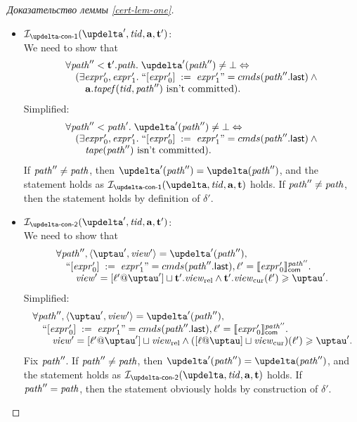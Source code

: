 \begin{proof}[Доказательство леммы \ref{cert-lem-one}]
\begin{itemize}
\begin{itemize}
        \item $\invDeltaDefOne(\delta', \tId, \aT, \tT')$: \\
          We need to show that
          \[\begin{array}{l}
            \forall \cpath'' < \tT'.\cpath. \; \delta'(\cpath'') \not = \bot \Leftrightarrow \\
            \quad (\exists \expr'_0, \expr'_1. \; ``\writeInst{\expr'_0}{\expr'_1}" = \Cprom(\lastInstr{\cpath''})
              \land {} \\
            \quad \quad \aT.\tapef(\tId, \cpath'') \text{ isn't committed}). \\
          \end{array}\]
          Simplified:
          \[\begin{array}{l}
            \forall \cpath'' < \cpath'. \; \delta'(\cpath'') \not = \bot \Leftrightarrow \\
            \quad (\exists \expr'_0, \expr'_1. \; ``\writeInst{\expr'_0}{\expr'_1}" = \Cprom(\lastInstr{\cpath''})
              \land {} \\
            \quad \quad \tape(\cpath'') \text{ isn't committed}). \\
          \end{array}\]
          If $\mathit{path}'' \not = \mathit{path}$, then $\delta'(\cpath'') = \delta(\cpath'')$, and the statement holds as
          $\invDeltaDefOne(\delta, \tId, \aT, \tT)$ holds.
          If $\mathit{path}'' \not = \mathit{path}$, then the statement holds by definition of $\delta'$.

        \item $\invDeltaDefTwo(\delta', \tId, \aT, \tT')$: \\
          We need to show that
          \[\begin{array}{l}
            \forall \cpath'', \angled{\tau', \R'} = \delta'(\cpath''), \\
            \quad ``\writeInst{\expr'_0}{\expr'_1}" = \Cprom(\lastInstr{\cpath''}), \loc' = \semfcom{\expr'_0}{\cpath''}. \\
            \quad \quad \R' = [\loc' @ \tau'] \sqcup \tT'.\Rrel \land \tT'.\Rcur(\loc') \ge \tau'. \\
          \end{array}\]
          Simplified:
          \[\begin{array}{l}
            \forall \cpath'', \angled{\tau', \R'} = \delta'(\cpath''), \\
            \quad ``\writeInst{\expr'_0}{\expr'_1}" = \Cprom(\lastInstr{\cpath''}), \loc' = \semfcom{\expr'_0}{\cpath''}. \\
            \quad \quad \R' = [\loc' @ \tau'] \sqcup \Rrel \land ([\loc @ \tau] \sqcup \Rcur)(\loc') \ge \tau'. \\
          \end{array}\]
          Fix $\mathit{path}''$. If $\mathit{path}'' \not = \mathit{path}$, then $\delta'(\cpath'') = \delta(\cpath'')$, and the statement holds as
          $\invDeltaDefTwo(\delta, \tId, \aT, \tT)$ holds.
          If $\mathit{path}'' = \mathit{path}$, then the statement obviously holds by construction of $\delta'$.


\end{itemize}
\end{itemize}
\end{proof}
